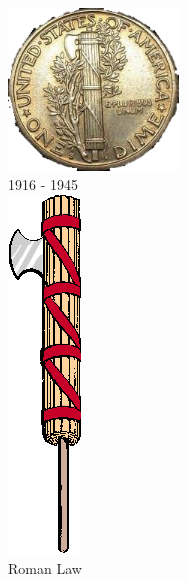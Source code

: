 \begin{frame}
    \begin{columns}[onlytextwidth]
            \centering
            \includegraphics[width=0.75\textwidth]{img/dime.png} \\
            1916 - 1945 \\

            \centering
            \includegraphics[height=0.55\textheight]{img/fasces.png} \\
            Roman Law\\

    \end{columns}
\end{frame}


